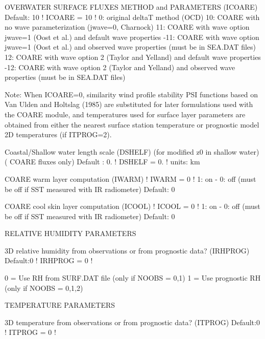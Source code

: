 \documentclass[a4paper,10pt]{article}
\begin{document}
    OVERWATER SURFACE FLUXES METHOD and PARAMETERS
          (ICOARE)                           Default: 10      ! ICOARE =  10   !
           0: original deltaT method (OCD)
          10: COARE with no wave parameterization (jwave=0, Charnock)
          11: COARE with wave option jwave=1 (Oost et al.)
              and default wave properties
         -11: COARE with wave option jwave=1 (Oost et al.)
              and observed wave properties (must be in SEA.DAT files)
          12: COARE with wave option 2 (Taylor and Yelland)
               and default wave properties
         -12: COARE with wave option 2 (Taylor and Yelland)
              and observed wave properties (must be in SEA.DAT files)

          Note:  When ICOARE=0, similarity wind profile stability PSI functions
                 based on Van Ulden and Holtslag (1985) are substituted for
                 later formulations used with the COARE module, and temperatures
                 used for surface layer parameters are obtained from either the
                 nearest surface station temperature or prognostic model 2D
                 temperatures (if ITPROG=2).


          Coastal/Shallow water length scale (DSHELF)
          (for modified z0 in shallow water)
          ( COARE fluxes only)
                                          Default : 0.        ! DSHELF = 0. !
                                          units: km

           COARE warm layer computation (IWARM)               ! IWARM =  0   !
           1: on - 0: off (must be off if SST measured with
           IR radiometer)                 Default: 0

           COARE cool skin layer computation (ICOOL)          ! ICOOL =  0   !
           1: on - 0: off (must be off if SST measured with
           IR radiometer)                 Default: 0

    RELATIVE HUMIDITY PARAMETERS

       3D relative humidity from observations or
       from prognostic data? (IRHPROG)       Default:0        ! IRHPROG =  0   !

          0 = Use RH from SURF.DAT file
              (only if NOOBS = 0,1)
          1 = Use prognostic RH
              (only if NOOBS = 0,1,2)

    TEMPERATURE PARAMETERS

       3D temperature from observations or
       from prognostic data? (ITPROG)        Default:0        ! ITPROG =  0   !
\end{document}
